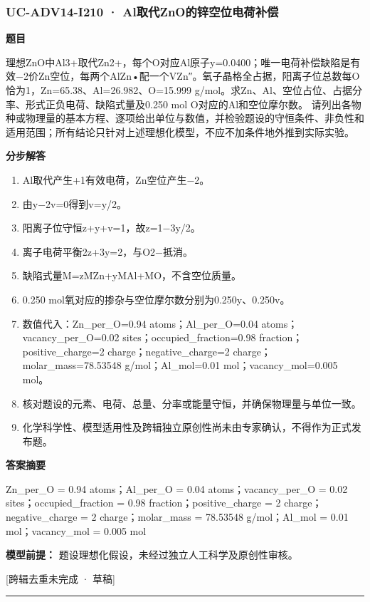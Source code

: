 \documentclass[UTF8,11pt,a4paper]{ctexart}
\begin{document}
\subsubsection*{UC-ADV14-I210 · Al取代ZnO的锌空位电荷补偿}
\noindent\textbf{题目}\par
理想ZnO中Al3+取代Zn2+，每个O对应Al原子y=0.0400；唯一电荷补偿缺陷是有效−2价Zn空位，每两个AlZn•配一个VZn″。氧子晶格全占据，阳离子位总数每O恰为1，Zn=65.38、Al=26.982、O=15.999 g/mol。求Zn、Al、空位占位、占据分率、形式正负电荷、缺陷式量及0.250 mol O对应的Al和空位摩尔数。 请列出各物种或物理量的基本方程、逐项给出单位与数值，并检验题设的守恒条件、非负性和适用范围；所有结论只针对上述理想化模型，不应不加条件地外推到实际实验。\par
\medskip\noindent\textbf{分步解答}
\begin{enumerate}
\item Al取代产生+1有效电荷，Zn空位产生−2。
\item 由y−2v=0得到v=y/2。
\item 阳离子位守恒z+y+v=1，故z=1−3y/2。
\item 离子电荷平衡2z+3y=2，与O2−抵消。
\item 缺陷式量M=zMZn+yMAl+MO，不含空位质量。
\item 0.250 mol氧对应的掺杂与空位摩尔数分别为0.250y、0.250v。
\item 数值代入：Zn\_per\_O=0.94 atoms；Al\_per\_O=0.04 atoms；vacancy\_per\_O=0.02 sites；occupied\_fraction=0.98 fraction；positive\_charge=2 charge；negative\_charge=2 charge；molar\_mass=78.53548 g/mol；Al\_mol=0.01 mol；vacancy\_mol=0.005 mol。
\item 核对题设的元素、电荷、总量、分率或能量守恒，并确保物理量与单位一致。
\item 化学科学性、模型适用性及跨辑独立原创性尚未由专家确认，不得作为正式发布题。
\end{enumerate}
\noindent\textbf{答案摘要}\par
Zn\_per\_O = 0.94 atoms；Al\_per\_O = 0.04 atoms；vacancy\_per\_O = 0.02 sites；occupied\_fraction = 0.98 fraction；positive\_charge = 2 charge；negative\_charge = 2 charge；molar\_mass = 78.53548 g/mol；Al\_mol = 0.01 mol；vacancy\_mol = 0.005 mol\par
\noindent\textbf{模型前提：}
题设理想化假设，未经过独立人工科学及原创性审核。\par
\noindent\textcolor{red!65!black}{[跨辑去重未完成 · 草稿]} \par
\medskip\hrule\medskip
{}
\end{document}
